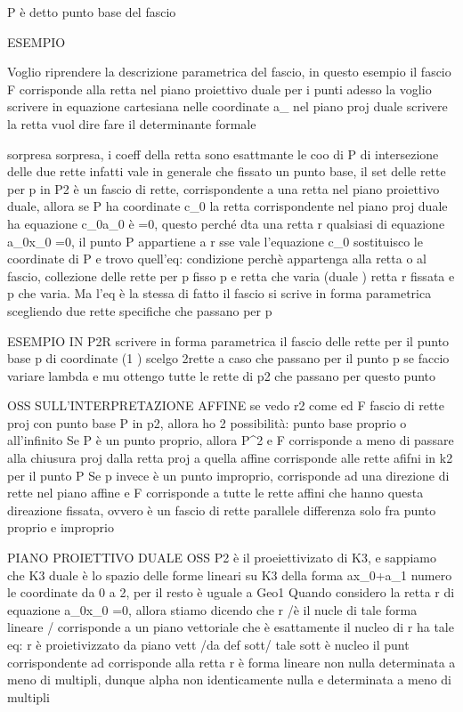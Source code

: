 P è detto punto base del fascio

ESEMPIO


Voglio riprendere la descrizione parametrica del fascio, in questo esempio il fascio F corrisponde alla retta nel piano proiettivo duale per i punti 
adesso la voglio scrivere in equazione cartesiana nelle coordinate a_    nel piano proj duale
scrivere la retta vuol dire fare il determinante formale


sorpresa sorpresa, i coeff della retta sono esattmante le coo di P di intersezione delle due rette
infatti vale in generale che fissato un punto base, il set delle rette per p in P2 è un fascio di rette, corrispondente a una retta nel piano proiettivo duale, allora se P ha coordinate c_0   la retta corrispondente nel piano proj duale ha equazione c_0a_0 è   =0, questo perché dta una retta r qualsiasi di equazione a_0x_0   =0, il punto P appartiene a r sse vale l'equazione c_0    sostituisco le coordinate di P e trovo quell'eq:   condizione perchè appartenga alla retta   o al fascio, collezione delle rette per p     fisso p e retta che varia (duale )   retta r fissata e p che varia. Ma l'eq è la stessa
di fatto il fascio si scrive in forma parametrica scegliendo due rette specifiche che passano per p

ESEMPIO IN P2R
scrivere in forma parametrica il fascio delle rette per il punto base p di coordinate (1 )   scelgo 2rette a caso che passano per il punto p
se faccio variare lambda e mu ottengo tutte le rette di p2 che passano per questo punto

OSS SULL'INTERPRETAZIONE AFFINE
se vedo r2 come   ed F fascio di rette proj con punto base P in p2, allora ho 2 possibilità: punto base proprio o all'infinito
Se P è un punto proprio, allora P\in\kamp^2 e F corrisponde a meno di passare alla chiusura proj dalla retta proj a quella affine corrisponde alle rette afifni in k2 per il punto P
Se p invece è un punto improprio, corrisponde ad una direzione di rette nel piano affine e F corrisponde a tutte le rette affini che hanno questa direazione fissata, ovvero è un fascio di rette parallele
differenza solo fra punto proprio e improprio


PIANO PROIETTIVO DUALE
OSS
P2 è il proeiettivizato di K3, e sappiamo che K3 duale è lo spazio delle forme lineari \alpha su K3 della forma ax_0+a_1    numero le coordinate da 0 a 2, per il resto è uguale a Geo1
Quando considero la retta r di equazione a_0x_0   =0, allora stiamo dicendo che r /è il nucle di tale forma lineare \alpha / corrisponde a un piano vettoriale che è esattamente il nucleo di \alpha 
r ha tale eq: r è proietivizzato da piano vett /da def sott/ tale sott è nucleo
il punt corrispondente ad \alpha corrisponde alla retta r    \alpha è forma lineare non nulla determinata a meno di multipli, dunque alpha non identicamente nulla e determinata a meno di multipli

